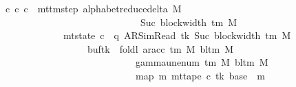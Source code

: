 \begin{isabellebody}
\ \ \ {\isachardoublequoteopen}{\isasymexists}c{\isacharprime}{\kern0pt}{\isacharprime}{\kern0pt}{\isachardot}{\kern0pt}\ {\isacharparenleft}{\kern0pt}c{\isacharprime}{\kern0pt}{\isacharcomma}{\kern0pt}\ c{\isacharprime}{\kern0pt}{\isacharprime}{\kern0pt}{\isacharparenright}{\kern0pt}\ {\isasymin}\ {\isacharparenleft}{\kern0pt}mttm{\isacharunderscore}{\kern0pt}step\ {\isacharparenleft}{\kern0pt}alphabet{\isacharunderscore}{\kern0pt}reduce{\isacharunderscore}{\kern0pt}delta\ M{\isacharparenright}{\kern0pt}{\isacharparenright}{\kern0pt}\isanewline
\ \ \ \ \ \ \ \ \ \ \ \ \ \ \ \ \ \ \ \ \ \ \ \ \ \ \ \ \ \ {\isacharcircum}{\kern0pt}{\isacharcircum}{\kern0pt}\ Suc\ {\isacharparenleft}{\kern0pt}block{\isacharunderscore}{\kern0pt}width\ {\isacharparenleft}{\kern0pt}{\isasymGamma}{\isacharunderscore}{\kern0pt}tm\ M{\isacharparenright}{\kern0pt}{\isacharparenright}{\kern0pt}\isanewline
\ \ \ \ \ \ \ \ \ \ \ \ \ \ {\isasymand}\ mt{\isacharunderscore}{\kern0pt}state\ c{\isacharprime}{\kern0pt}{\isacharprime}{\kern0pt}\ {\isacharequal}{\kern0pt}\ {\isacharparenleft}{\kern0pt}q{\isacharcomma}{\kern0pt}\ AR{\isacharunderscore}{\kern0pt}SimRead{\isacharcomma}{\kern0pt}\ tk{\isacharcomma}{\kern0pt}\ Suc\ {\isacharparenleft}{\kern0pt}block{\isacharunderscore}{\kern0pt}width\ {\isacharparenleft}{\kern0pt}{\isasymGamma}{\isacharunderscore}{\kern0pt}tm\ M{\isacharparenright}{\kern0pt}{\isacharparenright}{\kern0pt}{\isacharcomma}{\kern0pt}\isanewline
\ \ \ \ \ \ \ \ \ \ \ \ \ \ \ \ \ \ \ \ buf{\isacharparenleft}{\kern0pt}tk\ {\isacharcolon}{\kern0pt}{\isacharequal}{\kern0pt}\ foldl\ {\isacharparenleft}{\kern0pt}ar{\isacharunderscore}{\kern0pt}acc\ {\isacharparenleft}{\kern0pt}{\isasymGamma}{\isacharunderscore}{\kern0pt}tm\ M{\isacharparenright}{\kern0pt}\ {\isacharparenleft}{\kern0pt}bl{\isacharunderscore}{\kern0pt}tm\ M{\isacharparenright}{\kern0pt}{\isacharparenright}{\kern0pt}\isanewline
\ \ \ \ \ \ \ \ \ \ \ \ \ \ \ \ \ \ \ \ \ \ \ \ \ \ \ \ \ \ {\isacharparenleft}{\kern0pt}gamma{\isacharunderscore}{\kern0pt}unenum\ {\isacharparenleft}{\kern0pt}{\isasymGamma}{\isacharunderscore}{\kern0pt}tm\ M{\isacharparenright}{\kern0pt}\ {\isacharparenleft}{\kern0pt}bl{\isacharunderscore}{\kern0pt}tm\ M{\isacharparenright}{\kern0pt}\ {}{\isacharparenright}{\kern0pt}\isanewline
\ \ \ \ \ \ \ \ \ \ \ \ \ \ \ \ \ \ \ \ \ \ \ \ \ \ \ \ \ \ {\isacharparenleft}{\kern0pt}map\ {\isacharparenleft}{\kern0pt}{\isasymlambda}m{\isachardot}{\kern0pt}\ mt{\isacharunderscore}{\kern0pt}tape\ c{\isacharprime}{\kern0pt}\ tk\ {\isacharparenleft}{\kern0pt}base\ {\isacharplus}{\kern0pt}\ m{\isacharparenright}{\kern0pt}{\isacharparenright}{\kern0pt}\isanewline

\end{isabellebody}
